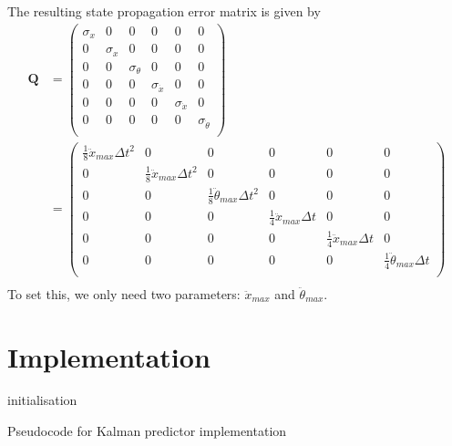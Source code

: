 \documentclass[12pt]{article}
\begin{document}
The resulting state propagation error matrix is given by
\begin{equation}
\begin{split}
\mathbf{Q}
    & =
    \begin{pmatrix}
        \sigma_x & 0 & 0 & 0 & 0 & 0 \\
        0 & \sigma_x & 0 & 0 & 0 & 0 \\
        0 & 0 & \sigma_{\theta} & 0 & 0 & 0 \\
        0 & 0 & 0 & \sigma_{\dot{x}} & 0 & 0 \\
        0 & 0 & 0 & 0 & \sigma_{\dot{x}} & 0 \\
        0 & 0 & 0 & 0 & 0 & \sigma_{\dot{\theta}} \\
    \end{pmatrix}
    \\
    & =
    \begin{pmatrix}
        \frac{1}{8} \ddot{x}_{max} \Delta{t}^2 & 0 & 0 & 0 & 0 & 0 \\
        0 & \frac{1}{8} \ddot{x}_{max} \Delta{t}^2 & 0 & 0 & 0 & 0 \\
        0 & 0 & \frac{1}{8} \ddot{\theta}_{max} \Delta{t}^2 & 0 & 0 & 0 \\
        0 & 0 & 0 & \frac{1}{4} \ddot{x}_{max} \Delta{t} & 0 & 0 \\
        0 & 0 & 0 & 0 & \frac{1}{4} \ddot{x}_{max} \Delta{t} & 0 \\
        0 & 0 & 0 & 0 & 0 & \frac{1}{4} \ddot{\theta}_{max} \Delta{t} \\
    \end{pmatrix}
    \\
\end{split}
\end{equation}
To set this, we only need two parameters: $\ddot{x}_{max}$ and $\ddot{\theta}_{max}$.


\section{Implementation}

\begin{algorithm}[H]
 initialisation\;

 \caption{Pseudocode for Kalman predictor implementation}
\end{algorithm}
\end{document}
